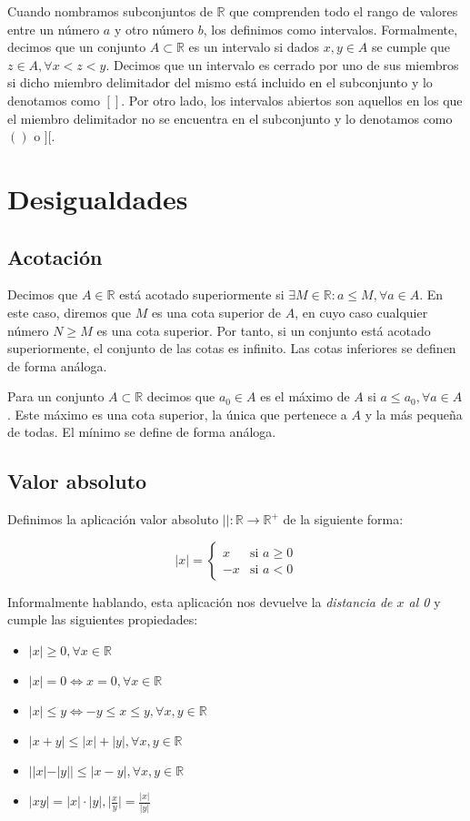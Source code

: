 Cuando nombramos subconjuntos de $\mathbb{R}$ que comprenden todo el rango de valores entre un número $a$ y otro número $b$, los definimos como intervalos.
Formalmente, decimos que un conjunto $A \subset\mathbb{R}$ es un intervalo si dados $x,y \in A$ se cumple que $z \in A, \forall x < z < y$.
Decimos que un intervalo es cerrado por uno de sus miembros si dicho miembro delimitador del mismo está incluido en el subconjunto y lo denotamos como $[]$.
Por otro lado, los intervalos abiertos son aquellos en los que el miembro delimitador no se encuentra en el subconjunto y lo denotamos como $()$ o $][$.

\section{Desigualdades}

\subsection{Acotación}
Decimos que $A \in\mathbb{R}$ está acotado superiormente si $\exists M \in\mathbb{R} : a \leq M, \forall a \in A$.
En este caso, diremos que $M$ es una cota superior de $A$, en cuyo caso cualquier número $N \geq M$ es una cota superior.
Por tanto, si un conjunto está acotado superiormente, el conjunto de las cotas es infinito.
Las cotas inferiores se definen de forma análoga.

Para un conjunto $A \subset\mathbb{R}$ decimos que $a_0 \in A$ es el máximo de $A$ si $a \leq a_0, \forall a \in A$.
Este máximo es una cota superior, la única que pertenece a $A$ y la más pequeña de todas.
El mínimo se define de forma análoga.

\subsection{Valor absoluto}

Definimos la aplicación valor absoluto $|| : \mathbb{R} \rightarrow \mathbb{R}^+$ de la siguiente forma:

\[
|x| =
\begin{cases}
	x  & \text{si } a \geq 0 \\
	-x & \text{si } a < 0
\end{cases}
\]

Informalmente hablando, esta aplicación nos devuelve la \textit{distancia de $x$ al 0} y cumple las siguientes propiedades:

\begin{itemize}
	\item $|x| \geq 0, \forall x \in\mathbb{R}$
	\item $|x| = 0 \iff x = 0, \forall x \in\mathbb{R}$
	\item $|x| \leq y \iff -y \leq x \leq y, \forall x,y \in\mathbb{R}$
	\item $|x+y| \leq |x| + |y|, \forall x,y \in\mathbb{R}$
	\item $||x| - |y|| \leq |x-y|, \forall x,y \in\mathbb{R}$
	\item $|xy| = |x| \cdot |y|, \big|\frac{x}{y}\big| = \frac{|x|}{|y|}$
\end{itemize}
